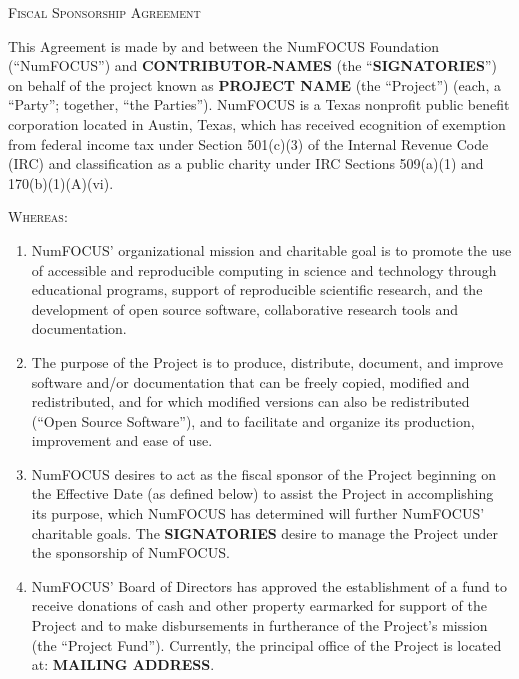 \documentclass[letterpaper,12pt]{article}
\newcommand{\project}{\textbf{PROJECT NAME}}
\newcommand{\contributors}{\textbf{CONTRIBUTOR-NAMES}}
\newcommand{\signatories}{\textbf{SIGNATORIES}}
\newcommand{\leadershipaddress}{\textbf{MAILING ADDRESS}}
\begin{document}
\begin{center}
\textsc{\Huge Fiscal Sponsorship Agreement}{\Huge {} } 
\par\end{center}

\bigskip{}

This Agreement is made by and between the NumFOCUS Foundation (``NumFOCUS'')
and \contributors{} (the ``\signatories{}'') on behalf of the project known as
\project{} (the ``Project'') (each, a ``Party''; together, ``the Parties'').
NumFOCUS is a Texas nonprofit public benefit corporation located in Austin,
Texas, which has received ecognition of exemption from federal income tax under
Section 501(c)(3) of the Internal Revenue Code (IRC) and classification as a
public charity under IRC Sections 509(a)(1) and 170(b)(1)(A)(vi).

\textsc{Whereas:}

\begin{enumerate}[label=\Alph*.,ref=\S \Alph*]

\item NumFOCUS' organizational mission and charitable goal is to promote the
  use of accessible and reproducible computing in science and technology
  through educational programs, support of reproducible scientific research,
  and the development of open source software, collaborative research tools and
  documentation.

\item The purpose of the Project is to produce, distribute, document, and
  improve software and/or documentation that can be freely copied, modified and
  redistributed, and for which modified versions can also be redistributed
  (``Open Source Software''), and to facilitate and organize its production,
  improvement and ease of use.

\item NumFOCUS desires to act as the fiscal sponsor of the Project beginning on
  the Effective Date (as defined below) to assist the Project in accomplishing
  its purpose, which NumFOCUS has determined will further NumFOCUS' charitable
  goals. The \signatories{} desire to manage the Project under the sponsorship
  of NumFOCUS.

\item NumFOCUS' Board of Directors has approved the establishment of a fund to
  receive donations of cash and other property earmarked for support of the
  Project and to make disbursements in furtherance of the Project's mission
  (the ``Project Fund''). Currently, the principal office of the Project is
  located at: \leadershipaddress{}.

\end{enumerate}
\end{document}
